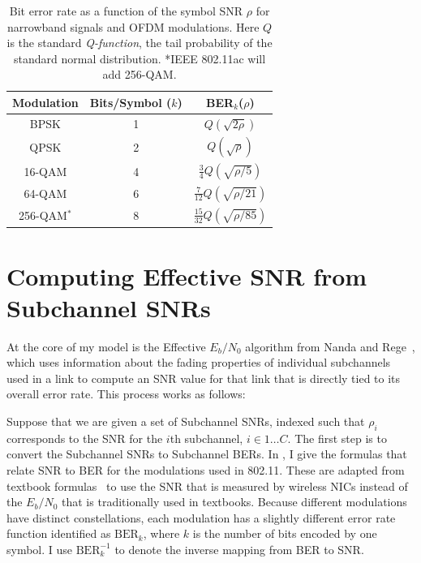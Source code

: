 \begin{table}
\centering
\begin{tabular}{ccc}
\toprule
Modulation & Bits/Symbol ($k$) & BER$_k$($\rho$) \\
\midrule BPSK & 1 & $Q\left(\sqrt{2\rho}\right)$ \\
QPSK & 2 & $Q\left(\sqrt{\rho}\right)$\\
16-QAM & 4 & $\frac{3}{4}Q\left(\sqrt{\rho/5}\right)$\\
64-QAM & 6 & $\frac{7}{12}Q\left(\sqrt{\rho/21}\right)$\\
256-QAM$^*$ & 8 & $\frac{15}{32}Q\left(\sqrt{\rho/85}\right)$\\
\bottomrule
\end{tabular}
\caption[Bit error rate as a function of the symbol SNR for OFDM modulations]{\label{tab:ber_snr}Bit error rate as a function of the symbol SNR $\rho$ for narrowband signals and OFDM modulations. Here $Q$ is the standard \emph{Q-function}, the tail probability of the standard normal distribution. *IEEE 802.11ac will add 256-QAM.}
\end{table}

\section{Computing Effective SNR from Subchannel SNRs}
At the core of my model is the Effective $E_b/N_0$ algorithm from Nanda and Rege~\cite{Nanda_EffectiveSNR}, which uses information about the fading properties of individual subchannels used in a link to compute an SNR value for that link that is directly tied to its overall error rate. This process works as follows:

Suppose that we are given a set of Subchannel SNRs, indexed such that $\rho_i$ corresponds to the SNR for the $i$th subchannel, $i\in1\dots C$. The first step is to convert the Subchannel SNRs to Subchannel BERs. In , I give the formulas that relate SNR to BER for the modulations used in 802.11. These are adapted from textbook formulas~\cite[\S3.7.1 and \S7.9.3.1]{Sklar} to use the SNR that is measured by wireless NICs instead of the $E_b/N_0$ that is traditionally used in textbooks. Because different modulations have distinct constellations, each modulation has a slightly different error rate function identified as $\text{BER}_k$, where $k$ is the number of bits encoded by one symbol. I use $\text{BER}_k^{-1}$ to denote the inverse mapping from BER to SNR.

